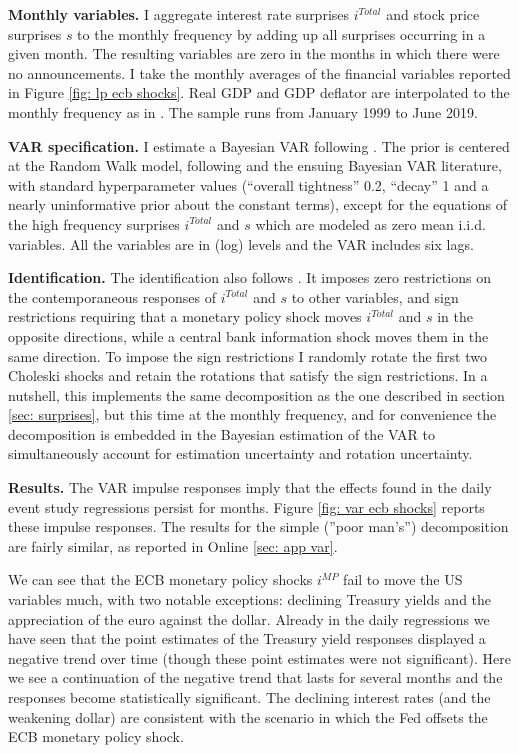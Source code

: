 \documentclass[a4paper,12pt]{article}
\begin{document}
\textbf{Monthly variables.} I aggregate interest rate surprises $i^{Total}$ and stock price surprises $s$ to the monthly frequency by adding up all surprises occurring in a given month.
The resulting variables are zero in the months in which there were no announcements. 
I take the monthly averages of the financial variables reported in Figure \ref{fig: lp ecb shocks}.
Real GDP and GDP deflator are interpolated to the monthly frequency as in \cite{Stock_Watson_2010}.
The sample runs from January 1999 to June 2019.

\textbf{VAR specification.} 
I estimate a Bayesian VAR following \cite{Jarocinski_Karadi_2020}.  
The prior is centered at the Random Walk model, following \citet*{Litterman_1979} and the ensuing Bayesian VAR literature, with standard hyperparameter values (``overall tightness'' 0.2, ``decay'' 1 and a nearly uninformative prior about the constant terms), except for the equations of the high frequency
surprises $i^{Total}$ and $s$ which are modeled as zero mean i.i.d. variables.
All the variables are in (log) levels and the VAR includes six lags.

\textbf{Identification.} The identification also follows \cite{Jarocinski_Karadi_2020}. It imposes zero restrictions on the contemporaneous responses of $i^{Total}$ and $s$ to other variables, and sign restrictions requiring that a monetary policy shock moves $i^{Total}$ and $s$ in the opposite directions, while a central bank information shock moves them in the same direction. To impose the sign restrictions I randomly rotate the first two Choleski shocks and retain the rotations that satisfy the sign restrictions. In a nutshell, this implements the same decomposition as the one described
in section \ref{sec: surprises}, but this time at the monthly frequency, and for convenience the decomposition
is embedded in the Bayesian estimation of the VAR to simultaneously account for estimation uncertainty and rotation uncertainty.

\textbf{Results.} The VAR impulse responses imply that the effects found in the daily event study regressions persist for months. 
Figure \ref{fig: var ecb shocks} reports these impulse responses. The results for the simple (''poor man's'') decomposition are fairly similar, as reported in Online \ref{sec: app var}.

We can see that the ECB monetary policy shocks $i^{MP}$ fail to move the US variables much,
with two notable exceptions: declining Treasury yields
and the appreciation of the euro against the dollar. 
Already in the daily regressions we have seen that the point estimates of the Treasury yield responses
displayed a negative trend over time (though these point estimates were not significant).
Here we see a continuation of the negative trend that lasts for several months and the responses
become statistically significant.
The declining interest rates (and the weakening dollar) are consistent with the scenario in which
the Fed offsets the ECB monetary policy shock.
\end{document}
